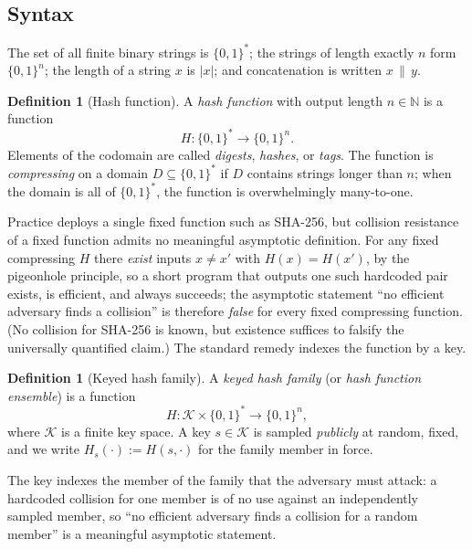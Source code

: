 \documentclass[11pt,a4paper]{article}
\theoremstyle{definition}
\newtheorem{definition}[theorem]{Definition}
\theoremstyle{remark}
\newcommand{\N}{\ensuremath{\mathbb{N}}}
\providecommand{\abs}[1]{\lvert #1 \rvert}
\begin{document}
\subsection{Syntax}\label{hash:subsec:syntax}

The set of all finite binary
strings is \(\{0,1\}^{*}\); the strings of length exactly \(n\) form
\(\{0,1\}^{n}\); the length of a string \(x\) is \(\abs{x}\); and
concatenation is written \(x \,\|\, y\).

\begin{definition}[Hash function]\label{hash:def:hashfn}
A \emph{hash function} with output length \(n \in \N\) is a function
\[
H \colon \{0,1\}^{*} \longrightarrow \{0,1\}^{n}.
\]
Elements of the codomain are called \emph{digests}, \emph{hashes}, or
\emph{tags}. The function is \emph{compressing} on a domain
\(D \subseteq \{0,1\}^{*}\) if \(D\) contains strings longer than
\(n\); when the domain is all of \(\{0,1\}^{*}\), the function is
overwhelmingly many-to-one.
\end{definition}

Practice deploys a single fixed function such as SHA-256, but
collision resistance of a fixed function admits no meaningful
asymptotic definition. For any fixed compressing \(H\) there
\emph{exist} inputs \(x \neq x'\) with \(H(x) = H(x')\), by the
pigeonhole principle, so a short program that outputs one such
hardcoded pair exists, is efficient, and always succeeds; the
asymptotic statement ``no efficient adversary finds a collision'' is
therefore \emph{false} for every fixed compressing function. (No
collision for SHA-256 is known, but existence suffices to falsify the
universally quantified claim.) The standard remedy indexes the
function by a key.

\begin{definition}[Keyed hash family]\label{hash:def:keyed}
A \emph{keyed hash family} (or \emph{hash function ensemble}) is a
function
\[
H \colon \mathcal{K} \times \{0,1\}^{*} \longrightarrow \{0,1\}^{n},
\]
where \(\mathcal{K}\) is a finite key space. A key
\(s \in \mathcal{K}\) is sampled \emph{publicly} at random, fixed, and
we write \(H_{s}(\cdot) := H(s, \cdot)\) for the family member in
force.
\end{definition}

The key indexes the member of the family that the adversary must
attack: a hardcoded collision for one member is of no use against an
independently sampled member, so ``no efficient adversary finds a
collision for a random member'' is a meaningful asymptotic statement.
\end{document}
